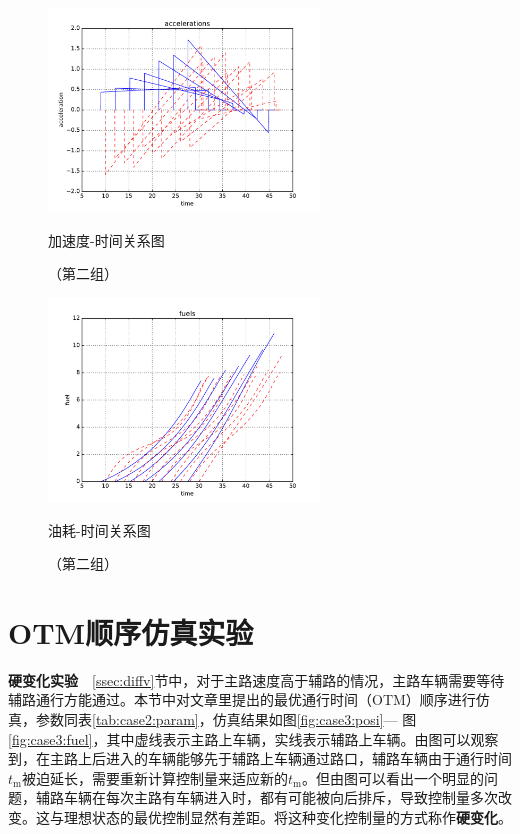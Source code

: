 \begin{figure}[htbp]
\begin{minipage}{0.48\textwidth}
  \centering
  \includegraphics[height=5.4cm]{figures/sim_case2/acc.pdf}
  \caption{加速度-时间关系图}
  \caption*{\small （第二组）}
  \label{fig:case2:acc}
\end{minipage}\hfill
\begin{minipage}{0.48\textwidth}
  \centering
  \includegraphics[height=5.4cm]{figures/sim_case2/fuel.pdf}
  \caption{油耗-时间关系图}
  \caption*{\small （第二组）}
  \label{fig:case2:fuel}
\end{minipage}
\end{figure}


\section{OTM顺序仿真实验}
\textbf{硬变化实验}\ \
\ref{ssec:diffv}节中，对于主路速度高于辅路的情况，主路车辆需要等待辅路通行方能通过。本节中对文章里提出的最优通行时间（OTM）顺序进行仿真，参数同表\ref{tab:case2:param}，仿真结果如图\ref{fig:case3:posi}--- 图\ref{fig:case3:fuel}，其中虚线表示主路上车辆，实线表示辅路上车辆。由图可以观察到，在主路上后进入的车辆能够先于辅路上车辆通过路口，辅路车辆由于通行时间$t_\mathrm{m}$被迫延长，需要重新计算控制量来适应新的$t_\mathrm{m}$。但由图可以看出一个明显的问题，辅路车辆在每次主路有车辆进入时，都有可能被向后排斥，导致控制量多次改变。这与理想状态的最优控制显然有差距。将这种变化控制量的方式称作\textbf{硬变化}。

